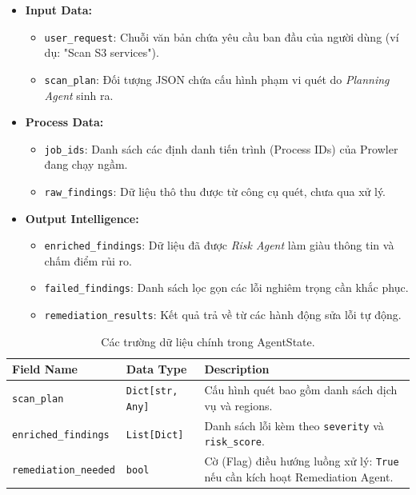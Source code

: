 \begin{itemize}
    \item \textbf{Input Data:}
    \begin{itemize}
        \item \texttt{user\_request}: Chuỗi văn bản chứa yêu cầu ban đầu của người dùng (ví dụ: "Scan S3 services").
        \item \texttt{scan\_plan}: Đối tượng JSON chứa cấu hình phạm vi quét do \textit{Planning Agent} sinh ra.
    \end{itemize}
    
    \item \textbf{Process Data:}
    \begin{itemize}
        \item \texttt{job\_ids}: Danh sách các định danh tiến trình (Process IDs) của Prowler đang chạy ngầm.
        \item \texttt{raw\_findings}: Dữ liệu thô thu được từ công cụ quét, chưa qua xử lý.
    \end{itemize}
    
    \item \textbf{Output Intelligence:}
    \begin{itemize}
        \item \texttt{enriched\_findings}: Dữ liệu đã được \textit{Risk Agent} làm giàu thông tin và chấm điểm rủi ro.
        \item \texttt{failed\_findings}: Danh sách lọc gọn các lỗi nghiêm trọng cần khắc phục.
        \item \texttt{remediation\_results}: Kết quả trả về từ các hành động sửa lỗi tự động.
    \end{itemize}
\end{itemize}

\begin{table}[H]
\centering
\label{tab:state_schema}
\begin{tabular}{p{4cm}p{3cm}p{7cm}}
\hline
\textbf{Field Name} & \textbf{Data Type} & \textbf{Description} \\ \hline
\texttt{scan\_plan} & \texttt{Dict[str, Any]} & Cấu hình quét bao gồm danh sách dịch vụ và regions. \\ \hline
\texttt{enriched\_findings} & \texttt{List[Dict]} & Danh sách lỗi kèm theo \texttt{severity} và \texttt{risk\_score}. \\ \hline
\texttt{remediation\_needed} & \texttt{bool} & Cờ (Flag) điều hướng luồng xử lý: \texttt{True} nếu cần kích hoạt Remediation Agent. \\ \hline
\end{tabular}
\caption{Các trường dữ liệu chính trong AgentState.}
\end{table}

